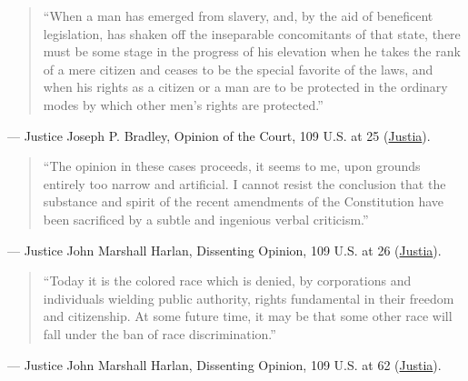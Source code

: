 \documentclass[12pt]{article}
\begin{document}
\begin{quote}
``When a man has emerged from slavery, and, by the aid of beneficent legislation, has shaken off the inseparable concomitants of that state, there must be some stage in the progress of his elevation when he takes the rank of a mere citizen and ceases to be the special favorite of the laws, and when his rights as a citizen or a man are to be protected in the ordinary modes by which other men's rights are protected.''
\end{quote}
\noindent --- Justice Joseph P. Bradley, Opinion of the Court, 109 U.S. at 25 (\href{https://supreme.justia.com/cases/federal/us/109/3/}{Justia}).

\begin{quote}
``The opinion in these cases proceeds, it seems to me, upon grounds entirely too narrow and artificial. I cannot resist the conclusion that the substance and spirit of the recent amendments of the Constitution have been sacrificed by a subtle and ingenious verbal criticism.''
\end{quote}
\noindent --- Justice John Marshall Harlan, Dissenting Opinion, 109 U.S. at 26 (\href{https://supreme.justia.com/cases/federal/us/109/3/}{Justia}).

\begin{quote}
``Today it is the colored race which is denied, by corporations and individuals wielding public authority, rights fundamental in their freedom and citizenship. At some future time, it may be that some other race will fall under the ban of race discrimination.''
\end{quote}
\noindent --- Justice John Marshall Harlan, Dissenting Opinion, 109 U.S. at 62 (\href{https://supreme.justia.com/cases/federal/us/109/3/}{Justia}).
\end{document}
